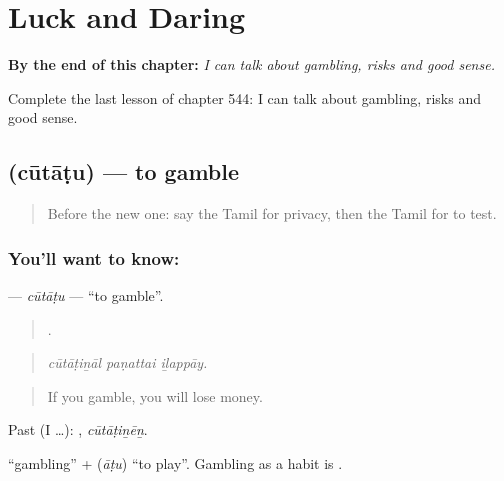
\chapter{Luck and Daring}
\label{ch:ta-luck-and-daring}

\begin{chapteropening}
\textbf{By the end of this chapter:} \emph{I can talk about gambling, risks and good sense.}

Complete the last lesson of chapter 544: I can talk about gambling, risks and good sense.
\end{chapteropening}

\section[\texorpdfstring{\ta{சூதாடு} (cūtāṭu)}{சூதாடு (cūtāṭu)}]{ (cūtāṭu) — to gamble}

\label{lesson:TA-C544-cutatu}



\begin{quote}
Before the new one: say the Tamil for privacy, then the Tamil for to test.
\end{quote}

\subsection*{You'll want to know: }
\textbf{} — \emph{cūtāṭu} — \textquotedblleft{}to gamble\textquotedblright{}.

\begin{quote}
  .
\end{quote}

\begin{quote}
\emph{cūtāṭiṉāl paṇattai iḻappāy.}
\end{quote}

\begin{quote}
If you gamble, you will lose money.
\end{quote}

Past (I …): , \emph{cūtāṭiṉēṉ}.

 \textquotedblleft{}gambling\textquotedblright{} +  (\emph{āṭu}) \textquotedblleft{}to play\textquotedblright{}. Gambling as a habit is .

